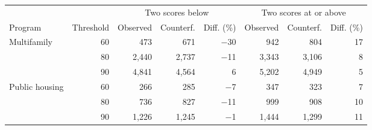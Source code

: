 \begin{tabular}{lrrrrrrr}
\toprule
& & \multicolumn{3}{c}{Two scores below} & \multicolumn{3}{c}{Two scores at or above} \\
\cmidrule(lr){3-5}\cmidrule(lr){6-8}
Program & Threshold & Observed & Counterf. & Diff. (\%) & Observed & Counterf. & Diff. (\%) \\
\midrule
Multifamily & 60 & 473 & 671 & $-$30 & 942 & 804 & 17 \\
 & 80 & 2,440 & 2,737 & $-$11 & 3,343 & 3,106 & 8 \\
 & 90 & 4,841 & 4,564 & 6 & 5,202 & 4,949 & 5 \\
Public housing & 60 & 266 & 285 & $-$7 & 347 & 323 & 7 \\
 & 80 & 736 & 827 & $-$11 & 999 & 908 & 10 \\
 & 90 & 1,226 & 1,245 & $-$1 & 1,444 & 1,299 & 11 \\
\bottomrule
\end{tabular}
